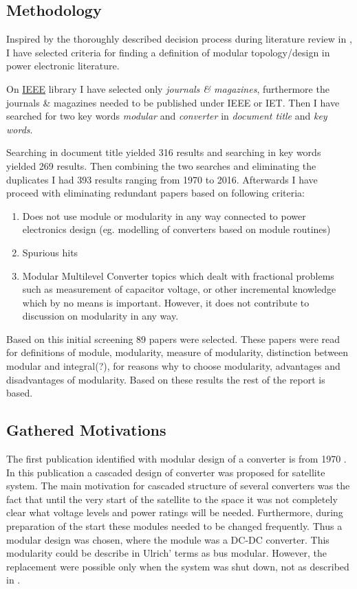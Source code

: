 \documentclass[]{scrartcl}
\begin{document}
\subsection{Methodology}
Inspired by the thoroughly described decision process during literature review in \cite{Salvador2007}, I have selected criteria for finding a definition of modular topology/design in power electronic literature. 

On \href{<http://ieeexplore.ieee.org/Xplore/home.jsp>}{IEEE} library I have selected only \emph{journals \& magazines}, furthermore the journals \& magazines needed to be published under IEEE or IET.  Then I have searched for two key words \emph{modular} and \emph{converter} in \emph{document title} and \emph{key words}. 

Searching in document title yielded 316 results and searching in key words yielded 269 results. Then combining the two searches and eliminating the duplicates I had 393 results ranging from 1970 to 2016. Afterwards I have proceed with eliminating redundant papers based on following criteria:
\begin{enumerate}
	\item Does not use module or modularity in any way connected to power electronics design (eg. modelling of converters based on module routines)
	\item Spurious hits
	\item Modular Multilevel Converter topics which dealt with fractional problems such as measurement of capacitor voltage, or other incremental knowledge which by no means is important. However, it does not contribute to discussion on modularity in any way.
\end{enumerate} 

Based on this initial screening 89 papers were selected. These papers were read for definitions of module, modularity, measure of modularity, distinction between modular and integral(?), for reasons why to choose modularity, advantages and disadvantages of modularity.  Based on these results the rest of the report is based.

\subsection{Gathered Motivations}

The first publication identified with modular design of a converter is from 1970 \cite{Landsman1970}. In this publication a cascaded design of converter was proposed for satellite system. The main motivation for cascaded structure of several converters was the fact that until the very start of the satellite to the space it was not completely clear what voltage levels and power ratings will be needed. Furthermore, during preparation of the start these modules needed to be changed frequently. Thus a modular design was chosen, where the module was a DC-DC converter. This modularity could be describe in Ulrich' terms as bus modular. However, the replacement were possible only when the system was shut down, not as described in \cite{Cottet2015}.
\end{document}
